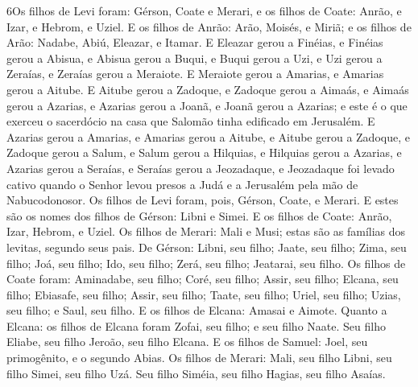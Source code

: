 \lettrine{6} Os filhos de Levi foram: Gérson, Coate e Merari,
e os filhos de Coate: Anrão, e Izar, e Hebrom, e Uziel. E os
filhos de Anrão: Arão, Moisés, e Miriã; e os filhos de Arão: Nadabe,
Abiú, Eleazar, e Itamar. E Eleazar gerou a Finéias, e Finéias
gerou a Abisua, e Abisua gerou a Buqui, e Buqui gerou a Uzi,
e Uzi gerou a Zeraías, e Zeraías gerou a Meraiote. E
Meraiote gerou a Amarias, e Amarias gerou a Aitube. E Aitube
gerou a Zadoque, e Zadoque gerou a Aimaás, e Aimaás gerou a
Azarias, e Azarias gerou a Joanã, e Joanã gerou a Azarias; e
este é o que exerceu o sacerdócio na casa que Salomão tinha
edificado em Jerusalém. E Azarias gerou a Amarias, e Amarias
gerou a Aitube, e Aitube gerou a Zadoque, e Zadoque gerou a
Salum, e Salum gerou a Hilquias, e Hilquias gerou a Azarias,
e Azarias gerou a Seraías, e Seraías gerou a Jeozadaque,
e Jeozadaque foi levado cativo quando o Senhor levou presos a
Judá e a Jerusalém pela mão de Nabucodonosor. Os filhos de
Levi foram, pois, Gérson, Coate, e Merari. E estes são os
nomes dos filhos de Gérson: Libni e Simei. E os filhos de
Coate: Anrão, Izar, Hebrom, e Uziel. Os filhos de Merari:
Mali e Musi; estas são as famílias dos levitas, segundo seus pais.
De Gérson: Libni, seu filho; Jaate, seu filho; Zima, seu
filho; Joá, seu filho; Ido, seu filho; Zerá, seu filho;
Jeatarai, seu filho. Os filhos de Coate foram: Aminadabe, seu
filho; Coré, seu filho; Assir, seu filho; Elcana, seu filho;
Ebiasafe, seu filho; Assir, seu filho; Taate, seu filho;
Uriel, seu filho; Uzias, seu filho; e Saul, seu filho. E os
filhos de Elcana: Amasai e Aimote. Quanto a Elcana: os filhos
de Elcana foram Zofai, seu filho; e seu filho Naate. Seu
filho Eliabe, seu filho Jeroão, seu filho Elcana. E os filhos
de Samuel: Joel, seu primogênito, e o segundo Abias. Os
filhos de Merari: Mali, seu filho Libni, seu filho Simei, seu filho
Uzá. Seu filho Siméia, seu filho Hagias, seu filho Asaías.

